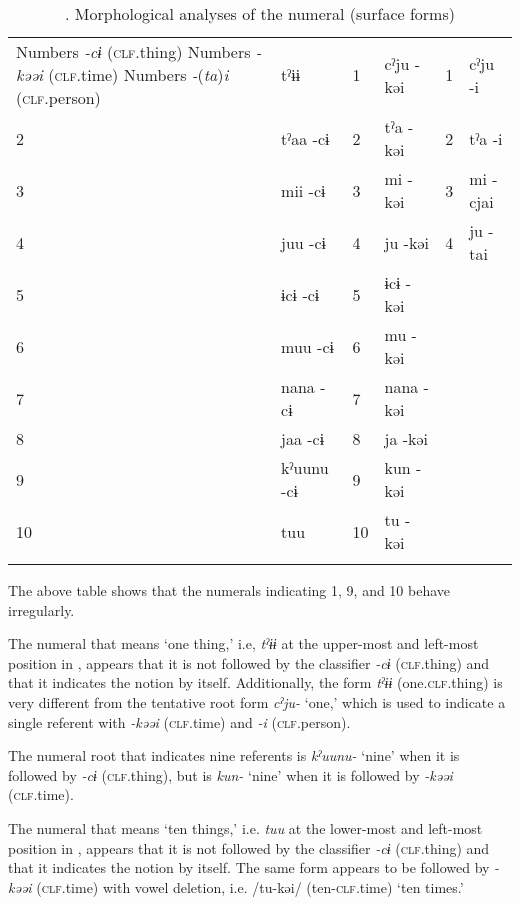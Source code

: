 \begin{table}
\caption{\label{tab:key:50}. Morphological analyses of the numeral (surface forms)}
\begin{tabular}{ll ll ll}
Numbers  \textit{{}-cɨ} (\textsc{clf}.thing)    Numbers  \textit{{}-kəəi} (\textsc{clf}.time)    Numbers  \textit{{}-}(\textit{ta})\textit{i} (\textsc{clf}.person)
\midrule
1  &tˀɨɨ          &  1 & cˀju  {}-kəi& 1  &  cˀju  {}-i\\
2  &tˀaa    {}-cɨ &  2 & tˀa  {}-kəi & 2  & tˀa  {}-i  \\
3  &mii    {}-cɨ  &  3 & mi  {}-kəi  & 3  & mi  {}-cjai \\
4  &juu    {}-cɨ  &  4 & ju  {}-kəi  & 4  & ju  {}-tai  \\
5  &ɨcɨ    {}-cɨ  &  5 & ɨcɨ  {}-kəi &    &            \\
6  &muu    {}-cɨ  &  6 & mu  {}-kəi  &    &            \\
7  &nana    {}-cɨ &  7 & nana  {}-kəi&    &            \\
8  &jaa    {}-cɨ  &  8 & ja  {}-kəi  &    &            \\
9  &kˀuunu {}-cɨ  &  9 & kun  {}-kəi &    &            \\
10 & tuu          & 10 & tu  {}-kəi  &    &            \\
\lspbottomrule
\end{tabular}
\end{table}

 The above table shows that the numerals indicating 1, 9, and 10 behave irregularly.

 The numeral that means ‘one thing,’ i.e, \textit{tˀɨɨ} at the upper-most and left-most position in , appears that it is not followed by the classifier \textit{{}-cɨ} (\textsc{clf}.thing) and that it indicates the notion by itself. Additionally, the form \textit{tˀɨɨ} (one.\textsc{clf}.thing) is very different from the tentative root form \textit{cˀju-} ‘one,’ which is used to indicate a single referent with \textit{-kəəi} (\textsc{clf}.time) and \textit{{}-i} (\textsc{clf}.person).

 The numeral root that indicates nine referents is \textit{kˀuunu-} ‘nine’ when it is followed by \textit{{}-cɨ} (\textsc{clf}.thing), but is \textit{kun-} ‘nine’ when it is followed by \textit{{}-kəəi} (\textsc{clf}.time).

The numeral that means ‘ten things,’ i.e. \textit{tuu} at the lower-most and left-most position in , appears that it is not followed by the classifier \textit{{}-cɨ} (\textsc{clf}.thing) and that it indicates the notion by itself. The same form appears to be followed by \textit{{}-kəəi} (\textsc{clf}.time) with vowel deletion, i.e. /tu-kəi/ (ten-\textsc{clf}.time) ‘ten times.’

